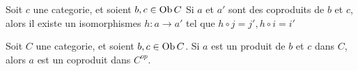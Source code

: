 \documentclass[../main.tex]{subfiles}
\begin{document}
\begin{lemma}
Soit $c$ une categorie, et soient $b,c \in \operatorname{Ob} C$ Si $a$ et $a'$ sont des coproduits de $b$ et $c$, alors il existe un isomorphismes $h : a \to a'$ tel que $h \circ j = j', h\circ i = i'$ 
\end{lemma}
\begin{rmq}
	Soit $C$ une categorie, et soient $b,c \in \operatorname{Ob} C$. Si $a$ est un produit de $b$ et $c$ dans $C$, alors $a$ est un coproduit dans $C^{op}$.
\end{rmq}

			
\end{document}
